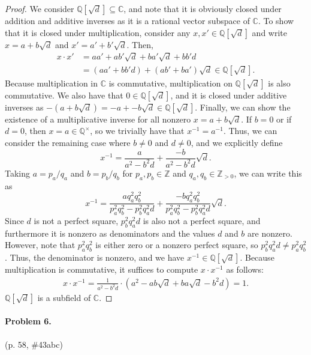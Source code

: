 \documentclass[12pt]{article}
\begin{document}
\begin{proof}
    We consider $\mathbb Q[\sqrt{d}] \subseteq \mathbb C$, and note that it is obviously closed under addition and additive inverses as it is a rational vector subspace of $\mathbb C$. To show that it is closed under multiplication, consider any $x, x' \in \mathbb Q[\sqrt{d}]$ and write $x = a + b \sqrt{d}$ and $x' = a' + b' \sqrt{d}$. Then, \begin{align*} x\cdot x' &= a a' + a b' \sqrt{d} + b a' \sqrt{d} + b b' d \\ &= (a a' + b b' d) + (a b' + b a') \sqrt{d} \in \mathbb Q[\sqrt{d}].\end{align*}
    Because multiplication in $\mathbb C$ is commutative, multiplication on $\mathbb Q[\sqrt{d}]$ is also commutative. We also have that $0 \in \mathbb Q[\sqrt{d}]$, and it is closed under additive inverses as $-(a + b \sqrt{d}) = -a + -b \sqrt{d} \in \mathbb Q[\sqrt{d}]$. Finally, we can show the existence of a multiplicative inverse for all nonzero $x = a + b \sqrt{d}$. If $b = 0$ or if $d = 0$, then $x = a \in \mathbb Q^\times$, so we trivially have that $x^{-1} = a^{-1}$. Thus, we can consider the remaining case where $b \neq 0$ and $d \neq 0$, and we explicitly define \[ x^{-1} = \frac{a}{a^2 - b^2 d} + \frac{-b}{a^2 - b^2 d} \sqrt{d}. \]
    Taking $a = p_a / q_a$ and $b = p_b / q_b$ for $p_a, p_b \in \mathbb Z$ and $q_a, q_b \in \mathbb Z_{>0}$, we can write this as
    \[ x^{-1} = \frac{a q_a^2 q_b^2}{p_a^2 q_b^2 - p_b^2 q_a^2 d} + \frac{-b q_a^2 q_b^2}{p_a^2 q_b^2 - p_b^2 q_a^2 d} \sqrt{d}. \]
    Since $d$ is not a perfect square, $p_b^2 q_a^2 d$ is also not a perfect square, and furthermore it is nonzero as denominators and the values $d$ and $b$ are nonzero. However, note that $p_a^2 q_b^2$ is either zero or a nonzero perfect square, so $p_b^2 q_a^2 d \neq p_a^2 q_b^2$. Thus, the denominator is nonzero, and we have $x^{-1} \in \mathbb Q[\sqrt{d}]$. Because multiplication is commutative, it suffices to compute $x \cdot x^{-1}$ as follows:
    \begin{align*}
        x \cdot x^{-1} = \frac{1}{a^2 - b^2d} \cdot (a^2 - ab \sqrt{d} + ba \sqrt{d} - b^2 d) = 1.
    \end{align*}
    $\mathbb Q[\sqrt{d}]$ is a subfield of $\mathbb C$.
\end{proof}

\paragraph{Problem 6.} (p. 58, \#43abc)
\end{document}
